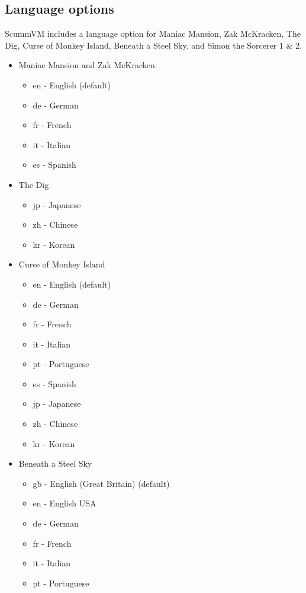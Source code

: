 \subsection{Language options}

ScummVM includes a language option for Maniac Mansion, Zak McKracken, The Dig,
Curse of Monkey Island, Beneath a Steel Sky. and Simon the Sorcerer 1 \& 2.

\begin{itemize}
\item Maniac Mansion and Zak McKracken:
  \begin{itemize}
   \item en  - English (default)
   \item de  - German
   \item fr  - French
   \item it  - Italian
   \item es  - Spanish
  \end{itemize}
\item The Dig
  \begin{itemize}
  \item jp  - Japanese
  \item zh  - Chinese
  \item kr  - Korean 
  \end{itemize}
\item Curse of Monkey Island
  \begin{itemize}
  \item en  - English (default)
  \item de  - German
  \item fr  - French
  \item it  - Italian
  \item pt  - Portuguese
  \item es  - Spanish
  \item jp  - Japanese
  \item zh  - Chinese
  \item kr  - Korean
  \end{itemize}
\item Beneath a Steel Sky
  \begin{itemize}
  \item gb  - English (Great Britain) (default)
  \item en  - English USA
  \item de  - German
  \item fr  - French
  \item it  - Italian
  \item pt  - Portuguese

\end{itemize}
\end{itemize}
